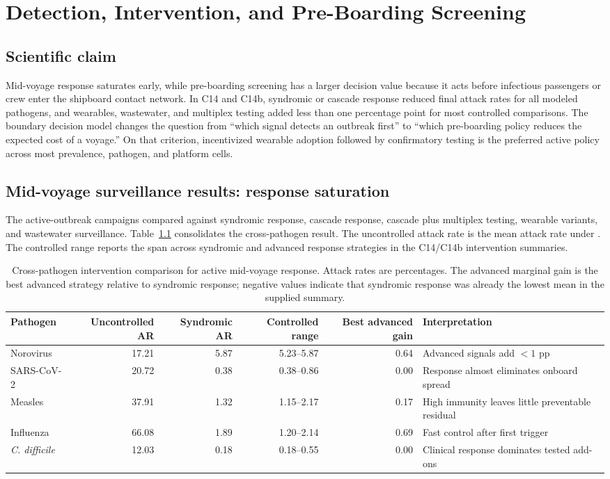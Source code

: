 \chapter{Detection, Intervention, and Pre-Boarding Screening}
\section{Scientific claim}
Mid-voyage response saturates early, while pre-boarding screening has a larger decision value
because it acts before infectious passengers or crew enter the shipboard contact network.
In C14 and C14b, syndromic or cascade response reduced final attack rates for all modeled
pathogens, and wearables, wastewater, and multiplex testing added less than one percentage point
for most controlled comparisons.
The boundary decision model changes the question from ``which signal detects an outbreak first''
to ``which pre-boarding policy reduces the expected cost of a voyage.''
On that criterion, incentivized wearable adoption followed by confirmatory testing is the preferred
active policy across most prevalence, pathogen, and platform cells.

\section{Mid-voyage surveillance results: response saturation}
The active-outbreak campaigns compared \nonetrue{} against syndromic response, cascade response,
cascade plus multiplex testing, wearable variants, and wastewater surveillance.
Table~\ref{tab:ch7-intervention-comparison} consolidates the cross-pathogen result.
The uncontrolled attack rate is the mean attack rate under \nonetrue{}.
The controlled range reports the span across syndromic and advanced response strategies in the
C14/C14b intervention summaries.

\begin{table}[htbp]
\centering
\caption{Cross-pathogen intervention comparison for active mid-voyage response. Attack rates are percentages. The advanced marginal gain is the best advanced strategy relative to syndromic response; negative values indicate that syndromic response was already the lowest mean in the supplied summary.}
\label{tab:ch7-intervention-comparison}
\scriptsize
\begin{tabular}{p{1.8cm}rrrrp{2.8cm}}
\toprule
Pathogen & Uncontrolled AR & Syndromic AR & Controlled range & Best advanced gain & Interpretation \\
\midrule
Norovirus & 17.21 & 5.87 & 5.23--5.87 & 0.64 & Advanced signals add $<1$ pp \\
SARS-CoV-2 & 20.72 & 0.38 & 0.38--0.86 & 0.00 & Response almost eliminates onboard spread \\
Measles & 37.91 & 1.32 & 1.15--2.17 & 0.17 & High immunity leaves little preventable residual \\
Influenza & 66.08 & 1.89 & 1.20--2.14 & 0.69 & Fast control after first trigger \\
\emph{C. difficile} & 12.03 & 0.18 & 0.18--0.55 & 0.00 & Clinical response dominates tested add-ons \\
\bottomrule
\end{tabular}
\end{table}

